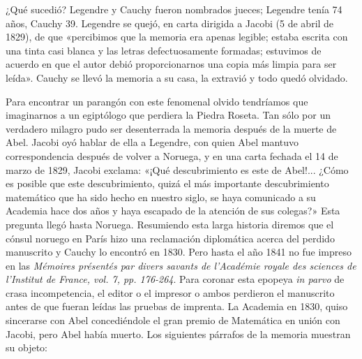 \documentclass[a4paper, 12pt, draft]{article}
\begin{document}
¿Qué sucedió? Legendre y Cauchy fueron nombrados jueces; Legendre tenía 74 años, Cauchy 39. Legendre se quejó, en carta dirigida a Jacobi (5 de abril de 1829), de que «percibimos que la memoria era apenas legible; estaba escrita con una tinta casi blanca y las letras defectuosamente formadas; estuvimos de acuerdo en que el autor debió proporcionarnos una copia más limpia para ser leída». Cauchy se llevó la memoria a su casa, la extravió y todo quedó olvidado.

Para encontrar un parangón con este fenomenal olvido tendríamos que imaginarnos a un egiptólogo que perdiera la Piedra Roseta. Tan sólo por un verdadero milagro pudo ser desenterrada la memoria después de la muerte de Abel. Jacobi oyó hablar de ella a Legendre, con quien Abel mantuvo correspondencia después de volver a Noruega, y en una carta fechada el 14 de marzo de 1829, Jacobi exclama: «¡Qué descubrimiento es este de Abel!...  ¿Cómo es posible que este descubrimiento, quizá el más importante descubrimiento matemático que ha sido hecho en nuestro siglo, se haya comunicado a su Academia hace dos años y haya escapado de la atención de sus colegas?» Esta pregunta llegó hasta Noruega. Resumiendo esta larga historia diremos que el cónsul noruego en París hizo una reclamación diplomática acerca del perdido manuscrito y Cauchy lo encontró en 1830. Pero hasta el año 1841 no fue impreso en las {\it Mémoires présentés par divers savants de l'Académie royale des sciences de l'Institut de France, vol. 7, pp. 176-264}. Para coronar esta epopeya {\it in parvo} de crasa incompetencia, el editor o el impresor o ambos perdieron el manuscrito antes de que fueran leídas las pruebas de imprenta. La Academia en 1830, quiso sincerarse con Abel concediéndole el gran premio de Matemática en unión con Jacobi, pero Abel había muerto. 
Los siguientes párrafos de la memoria muestran su objeto:
\end{document}

